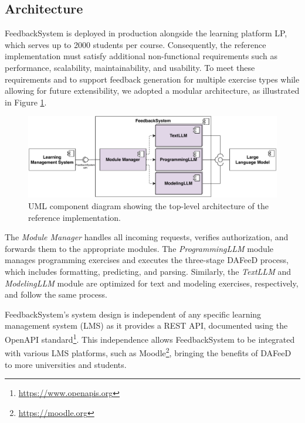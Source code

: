 \documentclass[sigconf,screen,review,anonymous]{acmart}
\begin{document}
\subsection{Architecture}

FeedbackSystem is deployed in production alongside the learning platform LP, which serves up to 2000 students per course.
Consequently, the reference implementation must satisfy additional non-functional requirements such as performance, scalability, maintainability, and usability.
To meet these requirements and to support feedback generation for multiple exercise types while allowing for future extensibility, we adopted a modular architecture, as illustrated in Figure \ref{fig:Athena-architecture}.

\begin{figure}[htbp]
  \vspace{-4mm}
  \centering
  \includegraphics[width=\linewidth]{figures/Athena-Architecture.pdf}
  \caption{UML component diagram showing the top-level architecture of the reference implementation.}
  \label{fig:Athena-architecture}
  \vspace{-4mm}
\end{figure}

The \textit{Module Manager} handles all incoming requests, verifies authorization, and forwards them to the appropriate modules.
The \textit{ProgrammingLLM} module manages programming exercises and executes the three-stage DAFeeD process, which includes formatting, predicting, and parsing. 
Similarly, the \textit{TextLLM} and \textit{ModelingLLM} module are optimized for text and modeling exercises, respectively, and follow the same process.

FeedbackSystem's system design is independent of any specific learning management system (LMS) as it provides a REST API, documented using the OpenAPI standard\footnote{\url{https://www.openapis.org}}.
This independence allows FeedbackSystem to be integrated with various LMS platforms, such as Moodle\footnote{\url{https://moodle.org}}, bringing the benefits of DAFeeD to more universities and students.
\end{document}
